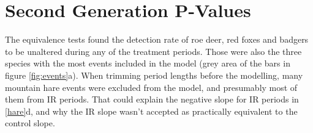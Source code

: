 %


%
%


\section{Second Generation P-Values}
The equivalence tests found the detection rate of roe deer, red foxes and badgers to be unaltered during any of the treatment periods.
Those were also the three species with the most events included in the model (grey area of the bars in figure \ref{fig:events}a).
When trimming period lengths before the modelling, many mountain hare events were excluded from the model, and presumably most of them from IR periods. That could explain the negative slope for IR periods in \ref{hare}d, and why the IR slope wasn't accepted as practically equivalent to the control slope.

